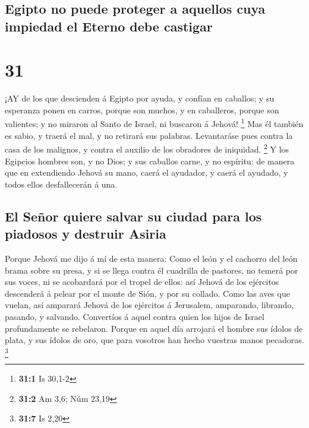 \hypertarget{egipto-no-puede-proteger-a-aquellos-cuya-impiedad-el-eterno-debe-castigar}{%
\subsection{Egipto no puede proteger a aquellos cuya impiedad el Eterno
debe
castigar}\label{egipto-no-puede-proteger-a-aquellos-cuya-impiedad-el-eterno-debe-castigar}}

\hypertarget{section-30}{%
\section{31}\label{section-30}}

 ¡AY de los que descienden á Egipto por ayuda, y confían en
caballos; y su esperanza ponen en carros, porque son muchos, y en
caballeros, porque son valientes; y no miraron al Santo de Israel, ni
buscaron á Jehová! \footnote{\textbf{31:1} Is 30,1-2}  Mas
él también es sabio, y traerá el mal, y no retirará sus palabras.
Levantaráse pues contra la casa de los malignos, y contra el auxilio de
los obradores de iniquidad. \footnote{\textbf{31:2} Am 3,6; Núm 23,19}
 Y los Egipcios hombres son, y no Dios; y sus caballos
carne, y no espíritu: de manera que en extendiendo Jehová su mano, caerá
el ayudador, y caerá el ayudado, y todos ellos desfallecerán á una.

\hypertarget{el-seuxf1or-quiere-salvar-su-ciudad-para-los-piadosos-y-destruir-asiria}{%
\subsection{El Señor quiere salvar su ciudad para los piadosos y
destruir
Asiria}\label{el-seuxf1or-quiere-salvar-su-ciudad-para-los-piadosos-y-destruir-asiria}}

 Porque Jehová me dijo á mí de esta manera: Como el león y
el cachorro del león brama sobre su presa, y si se llega contra él
cuadrilla de pastores, no temerá por sus voces, ni se acobardará por el
tropel de ellos: así Jehová de los ejércitos descenderá á pelear por el
monte de Sión, y por su collado.  Como las aves que vuelan,
así amparará Jehová de los ejércitos á Jerusalem, amparando, librando,
pasando, y salvando.  Convertíos á aquel contra quien los
hijos de Israel profundamente se rebelaron.  Porque en aquel
día arrojará el hombre sus ídolos de plata, y sus ídolos de oro, que
para vosotros han hecho vuestras manos pecadoras. \footnote{\textbf{31:7}
  Is 2,20}

